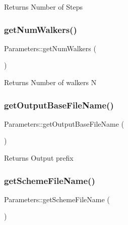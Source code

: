 \begin{DoxyReturn}{Returns}
Number of Steps 
\end{DoxyReturn}
\mbox{\label{class_parameters_adb8599bc60f977f684f32a83bbe28fc1}} 
\subsubsection{\texorpdfstring{get\+Num\+Walkers()}{getNumWalkers()}}
{\footnotesize\ttfamily Parameters\+::get\+Num\+Walkers (\begin{DoxyParamCaption}{ }\end{DoxyParamCaption})}

\begin{DoxyReturn}{Returns}
Number of walkers N 
\end{DoxyReturn}
\mbox{\label{class_parameters_a794fd941bf5ff311f61f2e6b4f19e64d}} 
\subsubsection{\texorpdfstring{get\+Output\+Base\+File\+Name()}{getOutputBaseFileName()}}
{\footnotesize\ttfamily Parameters\+::get\+Output\+Base\+File\+Name (\begin{DoxyParamCaption}{ }\end{DoxyParamCaption})}

\begin{DoxyReturn}{Returns}
Output prefix 
\end{DoxyReturn}
\mbox{\label{class_parameters_a7291b970983c021569cd2e3a0573592c}} 
\subsubsection{\texorpdfstring{get\+Scheme\+File\+Name()}{getSchemeFileName()}}
{\footnotesize\ttfamily Parameters\+::get\+Scheme\+File\+Name (\begin{DoxyParamCaption}{ }\end{DoxyParamCaption})}

